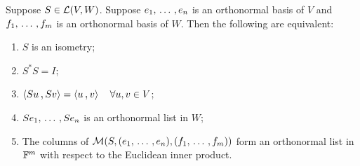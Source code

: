 \begin{thm}
  \label{thm: characterizations of isometries}
  Suppose $S \in \mathcal{L} (V,W)$. Suppose $e_1, {\, \ldots \,\,}, e_n$ is an orthonormal basis of $V$ and $f_1, {\, \ldots \,\,}, f_m$ is an orthonormal basis of $W$. Then the following are equivalent:
  \begin{enumerate}[label=\textbf{(\alph*)}]
    \item $S$ is an isometry;
    \item $S^*S = I$;
    \item $\ip{Su}{Sv} = \ip{u}{v} \quad \forall u,v \in V$;
    \item $Se_1, {\, \ldots \,\,}, Se_n$ is an orthonormal list in $W$;
    \item The columns of $\mathcal{M}(S, (e_1, {\, \ldots \,\,}, e_n), (f_1, {\, \ldots \,\,}, f_m))$ form an orthonormal list in $\mathbb{F}^m$ with respect to the Euclidean inner product.
  \end{enumerate}
\end{thm}
